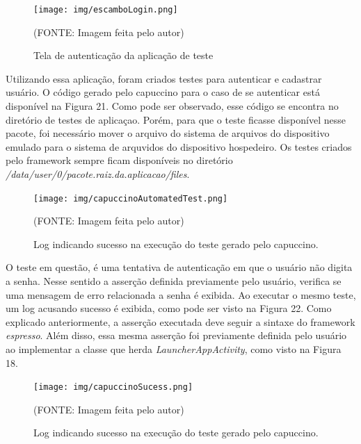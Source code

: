 \documentclass[
    12pt,       %
    openright,      %
    twoside,      %
    a4paper,      %
    english,      %
    french,       %
    spanish,      %
    brazil,       %
    ]{abntex2}
\begin{document}
      \begin{figure}[htbp]
        \begin{center}
          \texttt{[image: img/escamboLogin.png]}
            \end{center}
          \caption{\label{fig:passaro} Tela de autenticação da aplicação de teste}
        \begin{center}(FONTE: Imagem feita pelo autor)\end{center}
      \end{figure}

      Utilizando essa aplicação, foram criados testes para autenticar e cadastrar usuário. O código gerado pelo
      capuccino para o caso de se autenticar está disponível na Figura 21. Como pode ser observado, esse código
      se encontra no diretório de testes de aplicaçao. Porém, para que o teste ficasse disponível nesse pacote,
      foi necessário mover o arquivo do sistema de arquivos do dispositivo emulado para o sistema de arquvidos do
      dispositivo hospedeiro. Os testes criados pelo framework sempre ficam disponíveis no diretório
      \textit{/data/user/0/pacote.raiz.da.aplicacao/files}.

      \begin{figure}[htbp]
        \begin{center}
          \texttt{[image: img/capuccinoAutomatedTest.png]}
            \end{center}
          \caption{\label{fig:passaro} Log indicando sucesso na execução do teste gerado pelo capuccino.}
        \begin{center}(FONTE: Imagem feita pelo autor)\end{center}
      \end{figure}

      O teste em questão, é uma tentativa de autenticação em que o usuário não digita a senha. Nesse sentido
      a asserção definida previamente pelo usuário, verifica se uma mensagem de erro relacionada a senha é
      exibida. Ao executar o mesmo teste, um log acusando sucesso é exibida, como pode ser visto na Figura 22.
      Como explicado anteriormente, a asserção executada deve seguir a sintaxe do framework \textit{espresso}.
      Além disso, essa mesma asserção foi previamente definida pelo usuário ao implementar a classe que herda
      \textit{LauncherAppActivity}, como visto na Figura 18.

      \begin{figure}[htbp]
        \begin{center}
          \texttt{[image: img/capuccinoSucess.png]}
            \end{center}
          \caption{\label{fig:passaro} Log indicando sucesso na execução do teste gerado pelo capuccino.}
        \begin{center}(FONTE: Imagem feita pelo autor)\end{center}
      \end{figure}
\end{document}
